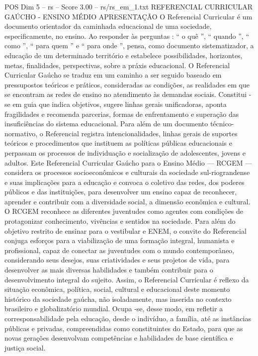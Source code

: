 \begin{textsample}{POS Dim 5 – rs – Score 3.00 – rs/rs\_em\_1.txt}  \label{ex:f5_pos_269}
REFERENCIAL CURRICULAR GAÚCHO - ENSINO MÉDIO APRESENTAÇÃO O Referencial Curricular é um documento orientador da caminhada educacional de uma sociedade, especificamente, no ensino.
Ao responder às perguntas : “ o quê ”, “ quando ”, “ como ”, “ para quem ” e “ para onde ”, pensa, como documento sistematizador, a educação de um determinado território e estabelece possibilidades, horizontes, metas, finalidades, perspectivas, sobre a práxis educacional.
O Referencial Curricular Gaúcho se traduz em um caminho a ser seguido baseado em pressupostos teóricos e práticos, consideradas as condições, as realidades em que se encontram as redes de ensino no atendimento às demandas sociais.
Constitui -se em guia que indica objetivos, sugere linhas gerais unificadoras, aponta fragilidades e recomenda parcerias, formas de enfrentamento e superação das insuficiências do sistema educacional.
Para além de um documento técnico-normativo, o Referencial registra intencionalidades, linhas gerais de suportes teóricos e procedimentos que instituem as políticas públicas educacionais e perpassam os processos de individuação e socialização de adolescentes, jovens e adultos.
Este Referencial Curricular Gaúcho para o Ensino Médio — RCGEM — considera os processos socioeconômicos e culturais da sociedade sul-riograndense e suas implicações para a educação e convoca o coletivo das redes, dos poderes públicos e das instituições, para desenvolver um ensino capaz de reconhecer, aprender e contribuir com a diversidade social, a dimensão econômica e cultural.
O RCGEM reconhece as diferentes juventudes como agentes com condições de protagonizar conhecimento, vivências e sentidos na sociedade.
Para além do objetivo restrito de ensinar para o vestibular e ENEM, o convite do Referencial conjuga esforços para a viabilização de uma formação integral, humanista e profissional, capaz de conectar as juventudes com o mundo contemporâneo, considerando seus desejos, suas criatividades e seus projetos de vida, para desenvolver as mais diversas habilidades e também contribuir para o desenvolvimento integral do sujeito.
Assim, o Referencial Curricular é reflexo da situação econômica, política, social, cultural e educacional deste momento histórico da sociedade gaúcha, não isoladamente, mas inserida no contexto brasileiro e globalizatório mundial.
Ocupa -se, desse modo, em refletir a corresponsabilidade pela educação, desde o indivíduo, a família, até as instâncias públicas e privadas, compreendidas como constituintes do Estado, para que as novas gerações desenvolvam competências e habilidades de base científica e justiça social.

\end{textsample}
